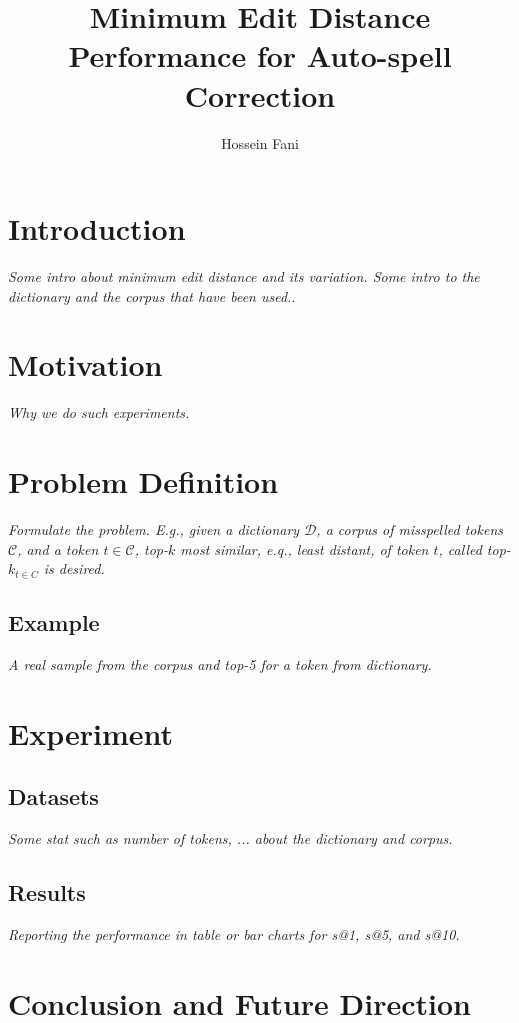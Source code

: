 \documentclass[sigconf]{acmart}
\begin{document}
\title{Minimum Edit Distance Performance for Auto-spell Correction}
\author{Hossein Fani}

\maketitle

\section{Introduction}
\textit{Some intro about minimum edit distance and its variation. Some intro to the dictionary and the corpus that have been used.}.
\section{Motivation}
\textit{Why we do such experiments.} 
\section{Problem Definition}
\textit{Formulate the problem. E.g., given a dictionary $\mathcal{D}$, a corpus of misspelled tokens $\mathcal{C}$, and a token $t\in \mathcal{C}$, top-$k$ most similar, e.q., least distant, of token $t$, called top-$k_{t\in C}$ is desired.} 
\subsection{Example}
\textit{A real sample from the corpus and top-5 for a token from dictionary.}
\section{Experiment}
\subsection{Datasets}
\textit{Some stat such as number of tokens, ... about the dictionary and corpus.}
\subsection{Results}
\textit{Reporting the performance in table or bar charts for s@1, s@5, and s@10.}
\section{Conclusion and Future Direction}

 
\end{document}
